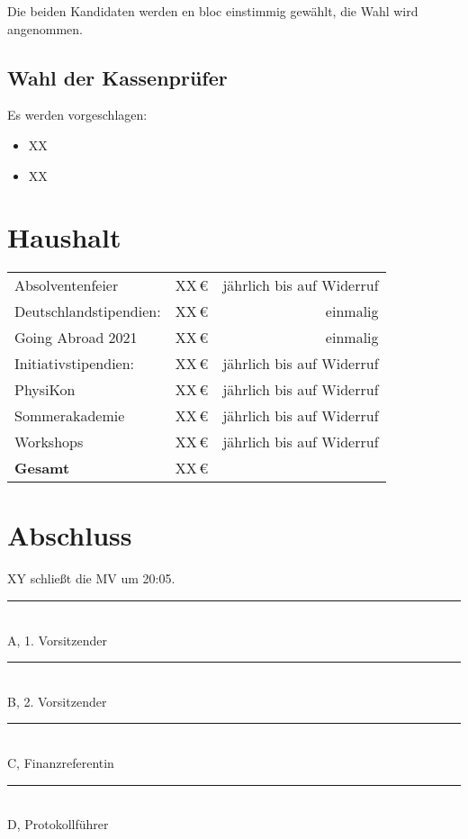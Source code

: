\documentclass[
  paper=a4,
  fontsize=12pt,
  parskip=half,
  headinclude=true,
]{scrartcl}
\newcommand{\unterschrift}[1]{%
  \begin{minipage}{0.45\linewidth}%
    \vspace{1.5cm}%
    \rule{\linewidth}{1pt}\\
    #1%
  \end{minipage}
}
\begin{document}
Die beiden Kandidaten werden en bloc einstimmig gewählt, die Wahl wird angenommen.


\subsection{Wahl der Kassenprüfer}
Es werden vorgeschlagen:

\begin{itemize}
  \item XX
  \item XX
\end{itemize}

\section{Haushalt}


\begin{center}
\begin{tabular}{l r r}
  \toprule
  Absolventenfeier       & XX\,€ & jährlich bis auf Widerruf\\
  Deutschlandstipendien: & XX\,€ & einmalig\\
  Going Abroad 2021      & XX\,€ & einmalig\\
  Initiativstipendien:   & XX\,€ & jährlich bis auf Widerruf\\
  PhysiKon               & XX\,€ & jährlich bis auf Widerruf\\
  Sommerakademie         & XX\,€ & jährlich bis auf Widerruf\\
  Workshops              & XX\,€ & jährlich bis auf Widerruf\\
  \midrule
  \bfseries Gesamt & XX\,€ & \\
  \bottomrule
\end{tabular}
\end{center}

\section{Abschluss}

XY schließt die MV um 20:05.

\unterschrift{A, 1. Vorsitzender}
\hfill
\unterschrift{B, 2. Vorsitzender}

\unterschrift{C, Finanzreferentin}
\hfill
\unterschrift{D, Protokollführer}
\end{document}
